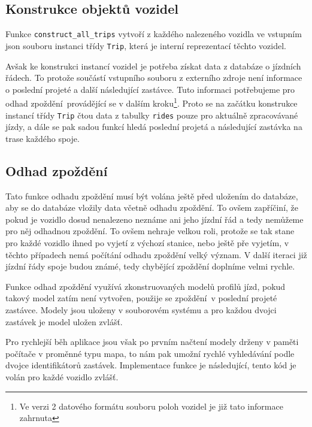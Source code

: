 \subsection{Konstrukce objektů vozidel}

Funkce \verb-construct_all_trips- vytvoří z každého nalezeného vozidla ve vstupním \gls{json} souboru instanci třídy \verb-Trip-, která je interní reprezentací těchto vozidel.

\bigbreak

Avšak ke konstrukci instancí vozidel je potřeba získat data z databáze o jízdních řádech. To protože součástí vstupního souboru z externího zdroje není informace o poslední projeté a další následující zastávce. Tuto informaci potřebujeme pro odhad zpoždění provádějící se v dalším kroku\footnote{Ve verzi 2 datového formátu souboru poloh vozidel je již tato informace zahrnuta}. Proto se na začátku konstrukce instancí třídy \verb-Trip- čtou data z tabulky \verb-rides- pouze pro aktuálně zpracovávané jízdy, a dále se pak sadou funkcí hledá poslední projetá a následující zastávka na trase každého spoje.

\subsection{Odhad zpoždění}

Tato funkce odhadu zpoždění musí být volána ještě před uložením do databáze, aby se do databáze vložily data včetně odhadu zpoždění. To ovšem zapříčiní, že pokud je vozidlo dosud nenalezeno neznáme ani jeho jízdní řád a tedy nemůžeme pro něj odhadnou zpoždění. To ovšem nehraje velkou roli, protože se tak stane pro každé vozidlo ihned po vyjetí z výchozí stanice, nebo ještě pře vyjetím, v těchto případech nemá počítání odhadu zpoždění velký význam. V další iteraci již jízdní řády spoje budou známé, tedy chybějící zpoždění doplníme velmi rychle.

\bigbreak

Funkce odhad zpoždění využívá zkonstruovaných modelů profilů jízd, pokud takový model zatím není vytvořen, použije se zpoždění v poslední projeté zastávce. Modely jsou uloženy v souborovém systému a pro každou dvojci zastávek je model uložen zvlášť.

\bigbreak

Pro rychlejší běh aplikace jsou však po prvním načtení modely drženy v paměti počítače v proměnné typu mapa, to nám pak umožní rychlé vyhledávání podle dvojce identifikátorů zastávek. Implementace funkce je následující, tento kód je volán pro každé vozidlo zvlášť.

